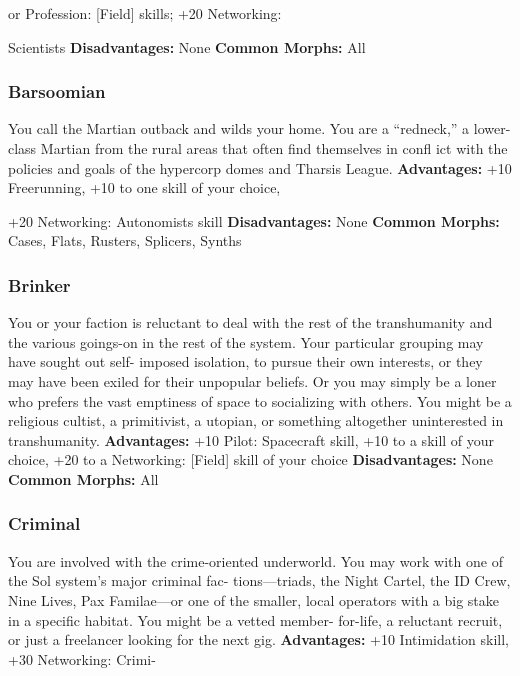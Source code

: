 or Profession: [Field] skills; +20 Networking: 

Scientists
\textbf{Disadvantages:} None
\textbf{Common Morphs:} All

\subsubsection{Barsoomian}

You call the Martian outback and wilds your home. 
You are a ``redneck,'' a lower-class Martian from the 
rural areas that often find themselves in confl ict with 
the policies and goals of the hypercorp domes and 
Tharsis League.
\textbf{Advantages:} +10 Freerunning, +10 to one skill of your choice, 

+20 Networking: Autonomists skill
\textbf{Disadvantages:} None
\textbf{Common Morphs:} Cases, Flats, Rusters, Splicers, Synths

\subsubsection{Brinker}

You or your faction is reluctant to deal with the rest of the 
transhumanity and the various goings-on in the rest of the 
system. Your particular grouping may have sought out self-
imposed isolation, to pursue their own interests, or they may 
have been exiled for their unpopular beliefs. Or you may 
simply be a loner who prefers the vast emptiness of space 
to socializing with others. You might be a religious cultist, a 
primitivist, a utopian, or something altogether uninterested 
in transhumanity.
\textbf{Advantages: }+10 Pilot: Spacecraft skill, +10 to a skill of your 
choice, +20 to a Networking: [Field] skill of your choice
\textbf{Disadvantages:} None
\textbf{Common Morphs:} All

\subsubsection{Criminal}

You are involved with the crime-oriented underworld. You 
may work with one of the Sol system's major criminal fac-
tions—triads, the Night Cartel, the ID Crew, Nine Lives, Pax 
Familae—or one of the smaller, local operators with a big 
stake in a specific habitat. You might be a vetted member-
for-life, a reluctant recruit, or just a freelancer looking for 
the next gig.
\textbf{Advantages:} +10 Intimidation skill, +30 Networking: Crimi-

